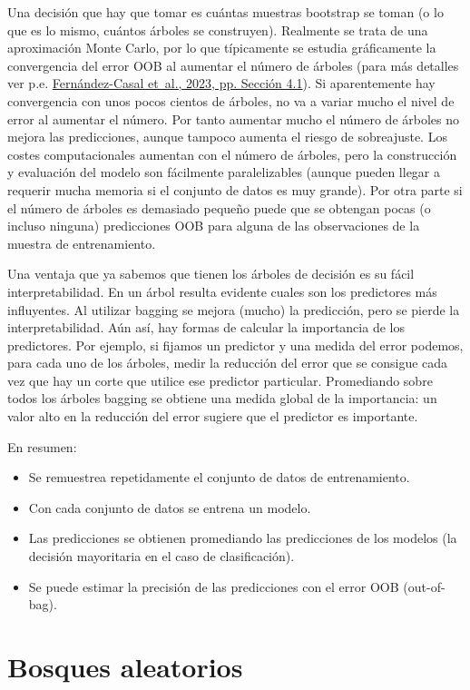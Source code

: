 \documentclass[
]{book}
\theoremstyle{break}
\theoremstyle{nonumberplain}
\begin{document}
Una decisión que hay que tomar es cuántas muestras bootstrap se toman (o lo que es lo mismo, cuántos árboles se construyen).
Realmente se trata de una aproximación Monte Carlo, por lo que típicamente se estudia gráficamente la convergencia del error OOB al aumentar el número de árboles (para más detalles ver p.e. \protect\hyperlink{ref-fernandez2023simbook}{Fernández-Casal et~al., 2023, pp. Sección 4.1}).
Si aparentemente hay convergencia con unos pocos cientos de árboles, no va a variar mucho el nivel de error al aumentar el número.
Por tanto aumentar mucho el número de árboles no mejora las predicciones, aunque tampoco aumenta el riesgo de sobreajuste.
Los costes computacionales aumentan con el número de árboles, pero la construcción y evaluación del modelo son fácilmente paralelizables (aunque pueden llegar a requerir mucha memoria si el conjunto de datos es muy grande).
Por otra parte si el número de árboles es demasiado pequeño puede que se obtengan pocas (o incluso ninguna) predicciones OOB para alguna de las observaciones de la muestra de entrenamiento.

Una ventaja que ya sabemos que tienen los árboles de decisión es su fácil interpretabilidad.
En un árbol resulta evidente cuales son los predictores más influyentes.
Al utilizar bagging se mejora (mucho) la predicción, pero se pierde la interpretabilidad.
Aún así, hay formas de calcular la importancia de los predictores.
Por ejemplo, si fijamos un predictor y una medida del error podemos, para cada uno de los árboles, medir la reducción del error que se consigue cada vez que hay un corte que utilice ese predictor particular.
Promediando sobre todos los árboles bagging se obtiene una medida global de la importancia: un valor alto en la reducción del error sugiere que el predictor es importante.

En resumen:

\begin{itemize}
\item
  Se remuestrea repetidamente el conjunto de datos de entrenamiento.
\item
  Con cada conjunto de datos se entrena un modelo.
\item
  Las predicciones se obtienen promediando las predicciones de los
  modelos (la decisión mayoritaria en el caso de clasificación).
\item
  Se puede estimar la precisión de las predicciones con el error OOB (out-of-bag).
\end{itemize}

\hypertarget{bosques-aleatorios}{%
\section{Bosques aleatorios}\label{bosques-aleatorios}}
\end{document}
